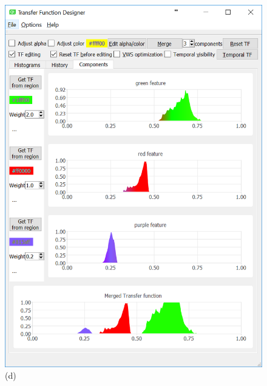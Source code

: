 \documentclass[twoside,twocolumn,10pt]{article}
\begin{document}
\begin{figure}
\begin{minipage}{.16\textwidth}
		\includegraphics[width=1\linewidth]{tf_vortex_merged_green_red_purple}
		(d)
	\end{minipage}~
	\begin{minipage}{.16\textwidth}
		\centering

\end{minipage}
\end{figure}
\end{document}
